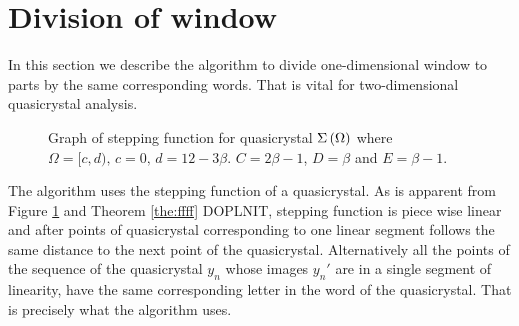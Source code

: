 \documentclass[text.tex]{subfiles}
\begin{document}
\section{Division of window}%
In this section we describe the algorithm to divide one-dimensional window to parts by the same corresponding words. That is vital for two-dimensional quasicrystal analysis.


\begin{figure}[h]
\centering
\caption{Graph of stepping function for quasicrystal $\Sigma\left(\Omega\right)$ where $\Omega = [c,d),\, c=0,\, d=12-3\beta$. $C= 2\beta-1$, $D= \beta$ and $E= \beta-1$.}
\label{img:steppingFunction}
\end{figure}

The algorithm uses the stepping function of a quasicrystal. As is apparent from Figure \ref{img:steppingFunction} and Theorem \ref{the:ffff} DOPLNIT, stepping function is piece wise linear and after points of quasicrystal corresponding to one linear segment follows the same distance to the next point of the quasicrystal. Alternatively all the points of the sequence of the quasicrystal $y_n$ whose images $y_n'$ are in a single segment of linearity, have the same corresponding letter in the word of the quasicrystal. That is precisely what the algorithm uses. 
\end{document}

